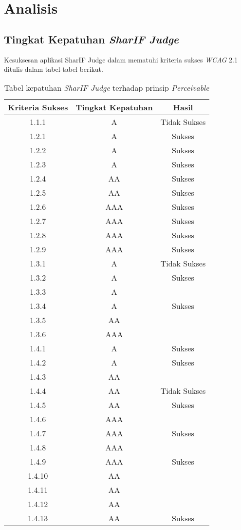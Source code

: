 \chapter{Analisis}
\label{chap:analisis}

\section{Tingkat Kepatuhan \textit{SharIF Judge}}
\label{sec:kepatuhan_sharif_judge_terhadap_wcag_2.1}
Kesuksesan aplikasi SharIF Judge dalam mematuhi kriteria sukses \textit{WCAG} 2.1 ditulis dalam tabel-tabel berikut.

\begin{table}[H]
	\centering
	\caption{Tabel kepatuhan \textit{SharIF Judge} terhadap prinsip \textit{Perceivable}}
	\label{tab:kepatuhan_sharif_judge_perceivable}
	\begin{tabular}{|c|c|c|}
		\hline
		Kriteria Sukses & Tingkat Kepatuhan & Hasil \\
		\hline
		1.1.1 & A & Tidak Sukses \\
		1.2.1 & A & Sukses \\
		1.2.2 & A & Sukses \\
		1.2.3 & A & Sukses \\
		1.2.4 & AA & Sukses \\
		1.2.5 & AA & Sukses \\
		1.2.6 & AAA & Sukses \\
		1.2.7 & AAA & Sukses \\
		1.2.8 & AAA & Sukses \\
		1.2.9 & AAA & Sukses \\
		1.3.1 & A & Tidak Sukses\\
		1.3.2 & A & Sukses \\
		1.3.3 & A &  \\
		1.3.4 & A & Sukses \\
		1.3.5 & AA &  \\
		1.3.6 & AAA &  \\
		1.4.1 & A & Sukses \\
		1.4.2 & A & Sukses \\
		1.4.3 & AA &  \\
		1.4.4 & AA & Tidak Sukses \\
		1.4.5 & AA & Sukses \\
		1.4.6 & AAA &  \\
		1.4.7 & AAA & Sukses \\
		1.4.8 & AAA &  \\
		1.4.9 & AAA & Sukses \\
		1.4.10 & AA &  \\
		1.4.11 & AA & \\
		1.4.12 & AA & \\
		1.4.13 & AA & Sukses \\
		\hline
	\end{tabular}
\end{table}

